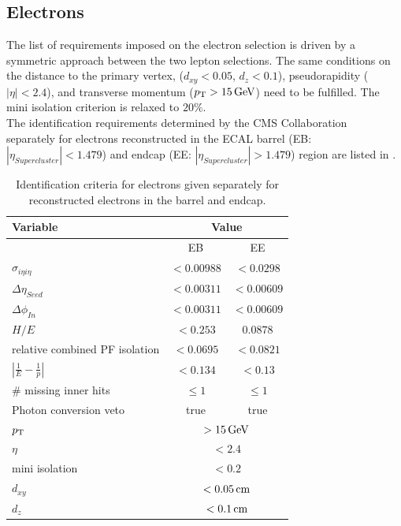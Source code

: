 \subsection{Electrons}
The list of requirements imposed on the electron selection is driven by a symmetric approach between the two lepton selections. The same conditions on the distance to the primary vertex, ($d_{xy}<0.05$, $d_z<0.1$), pseudorapidity ($|\eta|<2.4$), and transverse momentum ($p_{\mathrm{T}}>15\,\text{Ge\hspace{-.08em}V}$) need to be fulfilled. The mini isolation criterion is relaxed to $20\%$.\\
The identification requirements determined by the CMS Collaboration~\cite{ElectronID} separately for electrons reconstructed in the ECAL barrel (EB: $|\eta_{Supercluster}|<1.479$) and endcap (EE: $|\eta_{Supercluster}|>1.479$) region are listed in .
\begin{table}[tbp]
 \centering
 \caption{Identification criteria for electrons given separately for reconstructed electrons in the barrel and endcap.}
 \label{tab:eleID}
 \begin{tabular}{lcc}
  Variable                       & \multicolumn{2}{c}{Value}                   \\\hline
                                 & EB                             & EE         \\\hline
  $\sigma_{i\eta i\eta}$         & $<0.00988$                     & $<0.0298$  \\
  $\Delta\eta_{Seed}$            & $<0.00311$                     & $<0.00609$ \\
  $\Delta\phi_{In}$              & $<0.00311$                     & $<0.00609$ \\
  $H/E$                          & $<0.253$                       & $0.0878$   \\
  relative combined PF isolation & $<0.0695$                      & $<0.0821$  \\
  $|\frac{1}{E}-\frac{1}{p}|$    & $<0.134$                       & $<0.13$    \\
  \# missing inner hits          & $\leq1$                        & $\leq1$    \\
  Photon conversion veto         & true                           & true       \\\hline
  $p_{\mathrm{T}}$                          & \multicolumn{2}{c}{$>15\,\text{Ge\hspace{-.08em}V}$}               \\
  $\eta$                         & \multicolumn{2}{c}{$<2.4$}                  \\
  mini isolation                 & \multicolumn{2}{c}{$<0.2$}                  \\
  $d_{xy}$                       & \multicolumn{2}{c}{$<0.05\,\text{cm}$}              \\
  $d_z$                          & \multicolumn{2}{c}{$<0.1\,\text{cm}$}               \\\hline
 \end{tabular}
\end{table}
